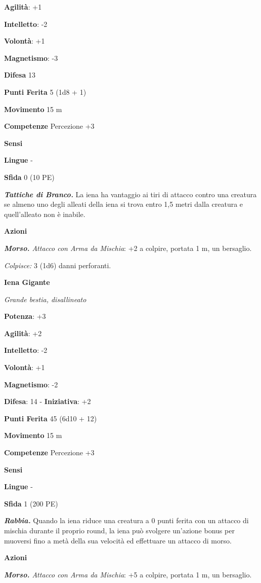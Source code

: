 \begin{multicols}{2}
\textbf{Agilità}: +1

\textbf{Intelletto}: -2

\textbf{Volontà}: +1

\textbf{Magnetismo}: -3

\textbf{Difesa} 13

\textbf{Punti Ferita} 5 (1d8 + 1)

\textbf{Movimento} 15 m

\textbf{Competenze} Percezione +3

\textbf{Sensi} 

\textbf{Lingue} -

\textbf{Sfida} 0 (10 PE)\smallskip

\emph{\textbf{Tattiche di Branco.}} La iena ha vantaggio ai tiri di
attacco contro una creatura se almeno uno degli alleati della iena si
trova entro 1,5 metri dalla creatura e quell'alleato non è inabile.

\smallskip\textbf{Azioni}

\emph{\textbf{Morso.} Attacco con Arma da Mischia}: +2 a colpire,
portata 1 m, un bersaglio.

\emph{Colpisce:} 3 (1d6) danni perforanti.

\textbf{Iena Gigante}

\emph{Grande bestia, disallineato}

\textbf{Potenza}: +3

\textbf{Agilità}: +2

\textbf{Intelletto}: -2

\textbf{Volontà}: +1

\textbf{Magnetismo}: -2

\textbf{Difesa}: 14 - \textbf{Iniziativa}: +2

\textbf{Punti Ferita} 45 (6d10 + 12)

\textbf{Movimento} 15 m

\textbf{Competenze} Percezione +3

\textbf{Sensi} 

\textbf{Lingue} -

\textbf{Sfida} 1 (200 PE)\smallskip

\emph{\textbf{Rabbia.}} Quando la iena riduce una creatura a 0 punti
ferita con un attacco di mischia durante il proprio round, la iena può
svolgere un'azione bonus per muoversi fino a metà della sua velocità ed
effettuare un attacco di morso.

\smallskip\textbf{Azioni}

\emph{\textbf{Morso.} Attacco con Arma da Mischia}: +5 a colpire,
portata 1 m, un bersaglio.


\end{multicols}
